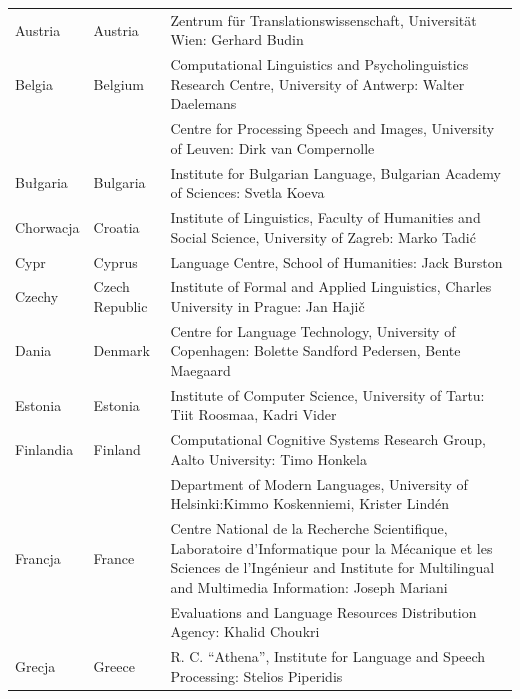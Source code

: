 \small \begin{longtable}{llp{115mm}} Austria &
\textcolor{grey1}{Austria} & Zentrum für Translationswissenschaft,
Universität Wien: Gerhard Budin\\
\addlinespace Belgia & \textcolor{grey1}{Belgium} & Computational
Linguistics and Psycholinguistics Research Centre, University of
Antwerp: Walter Daelemans\\
\addlinespace & & Centre for Processing Speech and Images, University
of Leuven: Dirk van Compernolle\\
\addlinespace Bułgaria & \textcolor{grey1}{Bulgaria} & Institute for
Bulgarian Language, Bulgarian Academy of Sciences: Svetla Koeva\\
\addlinespace Chorwacja & \textcolor{grey1}{Croatia} & Institute of
Linguistics, Faculty of Humanities and Social Science, University of
Zagreb: Marko Tadić\\
\addlinespace Cypr & \textcolor{grey1}{Cyprus} & Language Centre,
School of Humanities: Jack Burston\\
\addlinespace Czechy & \textcolor{grey1}{Czech Republic} & Institute
of Formal and Applied Linguistics, Charles University in Prague: Jan
Hajič\\
\addlinespace Dania & \textcolor{grey1}{Denmark} & Centre for Language
Technology, University of Copenhagen: \newline Bolette Sandford
Pedersen, Bente Maegaard\\
\addlinespace Estonia & \textcolor{grey1}{Estonia} & Institute of
Computer Science, University of Tartu: Tiit Roosmaa, Kadri Vider\\
\addlinespace Finlandia & \textcolor{grey1}{Finland} & Computational
Cognitive Systems Research Group, Aalto University: Timo Honkela\\
\addlinespace & & Department of Modern Languages, University of
Helsinki:\newline Kimmo Koskenniemi, Krister Lindén\\
\addlinespace Francja & \textcolor{grey1}{France} & Centre National de
la Recherche Scientifique, Laboratoire d'Informatique pour la
Mécanique et les Sciences de l'Ingénieur and Institute for
Multilingual and Multimedia Information: Joseph Mariani\\
\addlinespace & & Evaluations and Language Resources Distribution
Agency: Khalid Choukri\\
\addlinespace Grecja & \textcolor{grey1}{Greece} & R. C. “Athena”,
Institute for Language and Speech Processing: Stelios Piperidis\\

\end{longtable}
